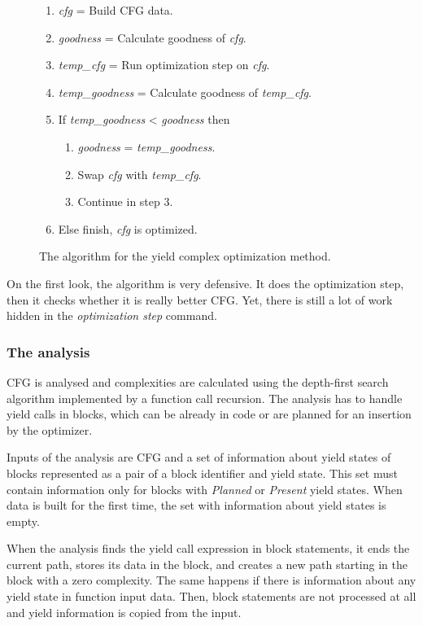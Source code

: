 \begin{figure}[h!]
\caption{The algorithm for the yield complex optimization method.}
\label{yield-algorithm}
\begin{enumerate}
\item{\emph{cfg} = Build CFG data.}
\item{\emph{goodness} = Calculate goodness of \emph{cfg}.}
\item{\emph{temp\_cfg} = Run optimization step on \emph{cfg}.}
\item{\emph{temp\_goodness} = Calculate goodness of \emph{temp\_cfg}.}
\item{If \emph{temp\_goodness} < \emph{goodness} then}
	\begin{enumerate}[label=5.\arabic*.]
	\item{\emph{goodness} = \emph{temp\_goodness}.}
	\item{Swap \emph{cfg} with \emph{temp\_cfg}.}
	\item{Continue in step 3.}
	\end{enumerate}
\item{Else finish, \emph{cfg} is optimized.}
\end{enumerate}
\end{figure}

On the first look, the algorithm is very defensive. It does the optimization step, then it checks whether it is really better CFG. Yet, there is still a lot of work hidden in the \emph{optimization step} command.

\subsubsection{The analysis}
CFG is analysed and complexities are calculated using the depth-first search algorithm implemented by a function call recursion. The analysis has to handle yield calls in blocks, which can be already in code or are planned for an insertion by the optimizer.

Inputs of the analysis are CFG and a set of information about yield states of blocks represented as a pair of a block identifier and yield state. This set must contain information only for blocks with \emph{Planned} or \emph{Present} yield states. When data is built for the first time, the set with information about yield states is empty.

When the analysis finds the yield call expression in block statements, it ends the current path, stores its data in the block, and creates a new path starting in the block with a zero complexity. The same happens if there is information about any yield state in function input data. Then, block statements are not processed at all and yield information is copied from the input.


